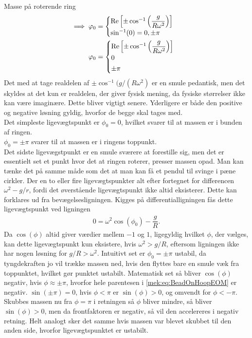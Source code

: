 \documentclass[crop=false, class=memoir]{standalone}
\begin{document}
\begin{opgave}[3]{Masse på roterende ring}
\begin{align*}
	\implies \phi_0 &= \begin{cases}
	\textup{Re}\left[\pm\cos^{-1}\left(\dfrac{g}{R\omega^2}\right)\right] \\[1mm]
	\sin^{-1}(0) = 0,\pm\pi
	\end{cases} \\
	\phi_0 &= \begin{cases}
	\textup{Re}\left[\pm\cos^{-1}\left(\dfrac{g}{R\omega^2}\right)\right] \\[.5mm]
	0 \\[.5mm]
	\pm\pi
	\end{cases}
\end{align*}
%
Det med at tage realdelen af $\pm\cos^{-1}(g/(R\omega^2)$ er en smule pedantisk, men det skyldes at det kun er realdelen, der giver fysisk mening, da fysiske størrelser ikke kan være imaginære. Dette bliver vigtigt senere. Yderligere er både den positive og negative løsning gyldig, hvorfor de begge skal tages med. \\[2mm]
%
Det simpleste ligevægtspunkt er $\phi_0 = 0$, hvilket svarer til at massen er i bunden af ringen. \\
$\phi_0 = \pm\pi$ svarer til at massen er i ringens toppunkt. \\
Det sidste ligevægstpunkt er en smule sværere at forestille sig, men det er essentielt set et punkt hvor det at ringen roterer, presser massen opad. Man kan tænke det på samme måde som det at man kan få et pendul til svinge i pæne cirkler.
%
\opg Der en to eller fire ligevægtspunkter alt efter fortegnet for differencen $\omega^2 - g/r$, fordi det øverstående ligevægtspunkt ikke altid eksisterer. Dette kan forklares ud fra bevægelsesligningen. Kigges på differentialligningen fås dette ligevægtspunkt ved ligningen
%
\begin{align} \label{mek:eq:phi0_def}
	0 = \omega^2\cos(\phi_0) - \dfrac{g}{R}.
\end{align}
%
Da $\cos(\phi)$ altid giver værdier mellem $-1$ og $1$, ligegyldig hvilket $\phi$, der vælges, kan dette ligevægtspunkt kun eksistere, hvis $\omega^2>g/R$, eftersom ligningen ikke har nogen løsning for $g/R>\omega^2$.
%
\opg Intuitivt set er $\phi_0=\pm\pi$ ustabil, da tyngdekraften jo vil trække massen ned, hvis den flyttes bare en smule væk fra toppunktet, hvilket gør punktet ustabilt. Matematisk set så bliver $\cos(\phi)$ negativ, hvis $\phi\approx\pm\pi$, hvorfor hele parentesen i \cref{mek:eq:BeadOnHoopEOM} er negativ. $\sin(\pm\pi)=0$, hvis $\phi<\pi$ er $\sin(\phi)>0$, og omvendt for $\phi<-\pi$. Skubbes massen nu fra $\phi=\pi$ i retningen så $\phi$ bliver mindre, så bliver $\sin(\phi)>0$, men da frontfaktoren er negativ, så vil den accelereres i negativ retning. Helt analogt sker det samme hvis massen var blevet skubbet til den anden side, hvorfor ligevægtspunktet er ustabilt. \\[2mm]

\end{opgave}
\end{document}
